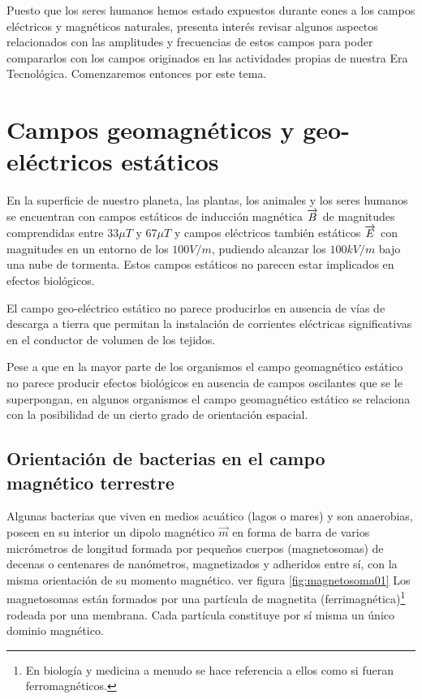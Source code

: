 Puesto que los seres humanos hemos estado expuestos durante eones a los campos eléctricos y magnéticos naturales, presenta interés revisar algunos aspectos relacionados con las amplitudes y frecuencias de estos campos para poder compararlos con los campos originados en las actividades propias de nuestra Era Tecnológica. Comenzaremos entonces por este tema.

\section{Campos geomagnéticos y geo-eléctricos estáticos}

En la superficie de nuestro planeta, las plantas, los animales y los seres humanos se encuentran con campos estáticos de inducción magnética $\overrightarrow{B}$ de magnitudes comprendidas entre $33\mu T$ y $67 \mu T$ y campos eléctricos también estáticos $\overrightarrow{E}$ con magnitudes en un entorno de los $100 V/m$, pudiendo alcanzar los $100 kV/m$ bajo una nube de tormenta. Estos campos estáticos no parecen estar implicados en efectos biológicos.

El campo geo-eléctrico estático no parece producirlos en ausencia de vías de descarga a tierra que permitan la instalación de corrientes eléctricas significativas en el conductor de volumen de los tejidos.

Pese a que en la mayor parte de los organismos el campo geomagnético estático no parece producir efectos biológicos en ausencia de campos oscilantes que se le superpongan, en algunos organismos el campo geomagnético estático se relaciona con la posibilidad de un cierto grado de orientación espacial.

\subsection{Orientación de bacterias en el campo magnético terrestre}

Algunas bacterias que viven en medios acuático (lagos o mares) y son anaerobias, poseen en su interior un dipolo magnético $\overrightarrow{m}$ en forma de barra de varios micrómetros de longitud formada por pequeños cuerpos (magnetosomas) de decenas o centenares de nanómetros, magnetizados y adheridos entre sí, con la misma orientación de su momento magnético. ver figura \ref{fig:magnetosoma01}
Los magnetosomas están formados por una partícula de magnetita (ferrimagnética)\footnote{En biología y medicina a menudo se hace referencia a ellos como si fueran ferromagnéticos.} rodeada por una membrana. Cada partícula constituye por sí misma un único dominio magnético.


